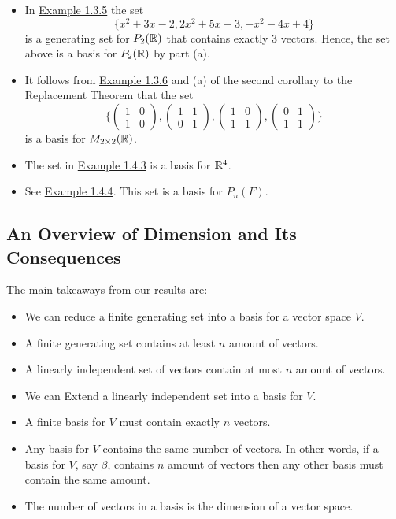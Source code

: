 \begin{eg}
    \begin{itemize}
        \item In {\hyperref[Generating Polynomials section 1.4]{Example 1.3.5}} the set   
    \[  \{ x^{2} + 3x - 2, 2x^{2} + 5x - 3,    -x^{2} - 4x + 4    \}  \] is a generating set for \( P_{2}(\mathbb{R}) \) that contains exactly \( 3  \) vectors. Hence, the set above is a basis for \( P_{2}(\mathbb{R}) \) by part (a).
\item It follows from {\hyperref[Generating Matrices section 1.4]{Example 1.3.6}} and (a) of the second corollary to the Replacement Theorem that the set  
    \[ \Big\{ \begin{pmatrix}
            1 & 0 \\
            1 & 0 
        \end{pmatrix},  \begin{pmatrix}
            1 & 1 \\ 
            0 & 1 
        \end{pmatrix},  \begin{pmatrix}
            1 & 0 \\ 
            1 & 1 
        \end{pmatrix},  \begin{pmatrix}
            0 & 1 \\
            1 & 1 
        \end{pmatrix}     \Big\} \] is a basis for \( M_{2 \times 2}(\mathbb{R}) \).
    \item The set in {\hyperref[A set of vectors in R4]{Example 1.4.3}} is a basis for \( \mathbb{R}^{4} \).
    \item See {\hyperref[Linearly Independent Set of Polys]{Example 1.4.4}}. This set is a basis for \( P_{n}(F) \). 
    \end{itemize}
\end{eg}


\subsection{An Overview of Dimension and Its Consequences}
The main takeaways from our results are:
\begin{itemize}
    \item We can reduce a finite generating set into a basis for a vector space \( V  \).
    \item A finite generating set contains at least \( n  \) amount of vectors.
    \item A linearly independent set of vectors contain at most \( n \) amount of vectors.
    \item We can Extend a linearly independent set into a basis for \( V  \).
    \item A finite basis for \( V  \) must contain exactly \( n  \) vectors.
    \item Any basis for \( V  \) contains the same number of vectors. In other words, if a basis for \( V \), say \( \beta \), contains \( n  \) amount of vectors then any other basis must contain the same amount.
    \item The number of vectors in a basis is the dimension of a vector space.
\end{itemize}


